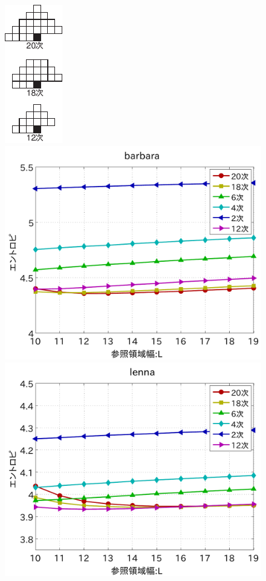 \documentclass[25pt, landscape,dvipdfmx]{foils}
\begin{document}
\begin{figure}[b]
\begin{center}
\vspace{-1cm}
\includegraphics[scale=2]{fig/yosokusiki.pdf}
\includegraphics[width=11.5cm]{fig/test1/barbara.pdf}
\includegraphics[width=11.5cm]{fig/test1/lenna.pdf}\\

\end{center}
\end{figure}
\end{document}
